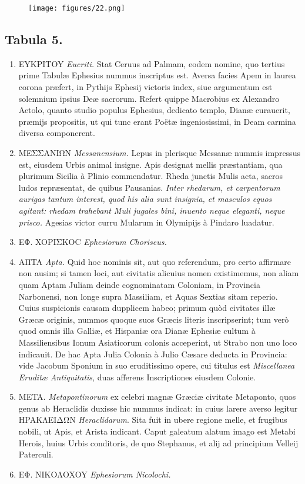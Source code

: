 \documentclass[a4paper, 11pt, oneside, polutonikogreek, latin]{article}
\begin{document}
\clearpage
\vspace*{\fill}
\begin{figure}[H]
\centering
\texttt{[image: figures/22.png]}
\end{figure}
\vspace*{\fill}
\clearpage
\subsection*{Tabula 5.}
\begin{enumerate}
    \item EYKPITOY \emph{Eucriti.} Stat Ceruus ad Palmam, eodem nomine, quo tertius prime Tabulæ Ephesius nummus inscriptus est. Aversa facies Apem in laurea corona præfert, in Pythijs Ephesij victoris index, siue argumentum est solemnium ipsius Deæ sacrorum. Refert quippe Macrobius ex Alexandro Aetolo, quanto studio populus Ephesius, dedicato templo, Dianæ curauerit, præmijs propositis, ut qui tunc erant Poëtæ ingeniosissimi, in Deam carmina diversa componerent.

    \item MEΣΣANIΩN \emph{Messanensium.} Lepus in plerisque Messanæ nummis impressus est, eiusdem Urbis animal insigne. Apis designat mellis præstantiam, qua plurimum Sicilia à Plinio commendatur. Rheda junctis Mulis acta, sacros ludos repræsentat, de quibus Pausanias. \emph{Inter rhedarum, et carpentorum aurigas tantum interest, quod his alia sunt insignia, et masculos equos agitant: rhedam trahebant Muli jugales bini, inuento neque eleganti, neque prisco.} Agesias victor curru Mularum in Olymipijs à Pindaro luadatur.

    \item EΦ. XOPIΣKOC \emph{Ephesiorum Choriseus.}

    \item AΠTA \emph{Apta.} Quid hoc nominis sit, aut quo referendum, pro certo affirmare non ausim; si tamen loci, aut civitatis alicuius nomen existimemus, non aliam quam Aptam Juliam deinde cognominatam Coloniam, in Provincia Narbonensi, non longe supra Massiliam, et Aquas Sextias sitam reperio. Cuius suspicionis causam dupplicem habeo; primum quòd civitates illæ Græcæ originis, nummos quoque suos Græcis literis inscripserint; tum verò quod omnis illa Galliæ, et Hispaniæ ora Dianæ Ephesiæ cultum à Massiliensibus Ionum Asiaticorum colonis acceperint, ut Strabo non uno loco indicauit. De hac Apta Julia Colonia à Julio Cæsare deducta in Provincia: vide Jacobum Sponium in suo eruditissimo opere, cui titulus est \emph{Miscellanea Eruditæ Antiquitatis}, duas afferens Inscriptiones eiusdem Colonie.

    \item META. \emph{Metapontinorum} ex celebri magnæ Græciæ civitate Metaponto, quos genus ab Heraclidis duxisse hic nummus indicat: in cuius larere averso legitur HPAKΛEIΔΩN \emph{Heraclidarum}. Sita fuit in ubere regione melle, et frugibus nobili, ut Apis, et Arista indicant. Caput galeatum alatum imago est Metabi Herois, huius Urbis conditoris, de quo Stephanus, et alij ad principium Velleij Paterculi.

    \item EΦ. NIKOΛOXOY \emph{Ephesiorum Nicolochi.}
\end{enumerate}
\end{document}

